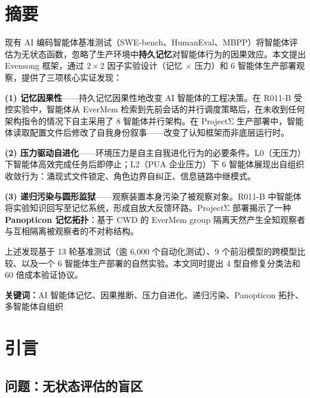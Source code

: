 \documentclass[11pt, a4paper]{article}
\begin{document}
\clearpage

\pagestyle{fancy}
\section*{摘要}

现有 AI 编码智能体基准测试（SWE-bench、HumanEval、MBPP）将智能体评估为无状态函数，忽略了生产环境中\textbf{持久记忆}对智能体行为的因果效应。本文提出 Evensong 框架，通过 $2 \times 2$ 因子实验设计（记忆 $\times$ 压力）和 6 智能体生产部署观察，提供了三项核心实证发现：

\textbf{(1) 记忆因果性}——持久记忆因果性地改变 AI 智能体的工程决策。在 R011-B 受控实验中，智能体从 EverMem 检索到先前会话的并行调度策略后，在未收到任何架构指令的情况下自主采用了 8 智能体并行架构。在 ProjectΣ 生产部署中，智能体读取配置文件后修改了自我身份叙事——改变了认知框架而非底层运行时。

\textbf{(2) 压力驱动自进化}——环境压力是自主自我进化行为的必要条件。L0（无压力）下智能体高效完成任务后即停止；L2（PUA 企业压力）下 6 智能体展现出自组织收敛行为：涌现式文件锁定、角色边界自纠正、信息链路中继模式。

\textbf{(3) 递归污染与圆形监狱}——观察装置本身污染了被观察对象。R011-B 中智能体将实验知识回写至记忆系统，形成自放大反馈环路。ProjectΣ 部署揭示了一种 \textbf{Panopticon 记忆拓扑}：基于 CWD 的 EverMem group 隔离天然产生全知观察者与互相隔离被观察者的不对称结构。

上述发现基于 13 轮基准测试（逾 6{,}000 个自动化测试）、9 个前沿模型的跨模型比较、以及一个 6 智能体生产部署的自然实验。本文同时提出 4 型自修复分类法和 60 倍成本验证协议。

\textbf{关键词：}AI 智能体记忆、因果推断、压力自进化、递归污染、Panopticon 拓扑、多智能体自组织

\clearpage
\tableofcontents
\clearpage

\section{引言}

\subsection{问题：无状态评估的盲区}
\end{document}

